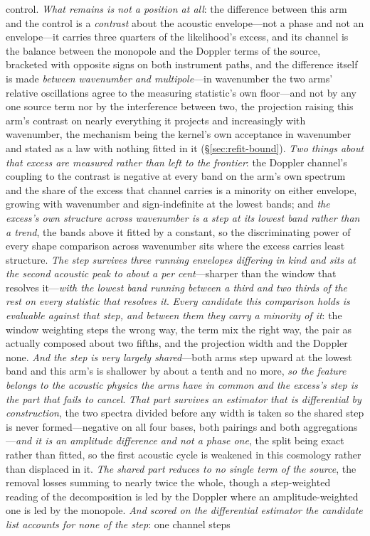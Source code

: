 \documentclass[11pt,a4paper]{article}
\theoremstyle{plain}
\theoremstyle{definition}
\theoremstyle{remark}
\begin{document}
\begin{enumerate}
control. \emph{What remains is not a position at all}: the difference between this arm and the control is a \emph{contrast} about the acoustic envelope---not a phase and not an envelope---it carries three quarters of the likelihood's excess, and its channel is the balance between the monopole and the Doppler terms of the source, bracketed with opposite signs on both instrument paths, and the difference itself is made \emph{between wavenumber and multipole}---in wavenumber the two arms' relative oscillations agree to the measuring statistic's own floor---and not by any one source term nor by the interference between two, the projection raising this arm's contrast on nearly everything it projects and increasingly with wavenumber, the mechanism being the kernel's own acceptance in wavenumber and stated as a law with nothing fitted in it (\S\ref{sec:refit-bound}). \emph{Two things about that excess are measured rather than left to the frontier}: the Doppler channel's coupling to the contrast is negative at every band on the arm's own spectrum and the share of the excess that channel carries is a minority on either envelope, growing with wavenumber and sign-indefinite at the lowest bands; and \emph{the excess's own structure across wavenumber is a step at its lowest band rather than a trend}, the bands above it fitted by a constant, so the discriminating power of every shape comparison across wavenumber sits where the excess carries least structure. \emph{The step survives three running envelopes differing in kind and sits at the second acoustic peak to about a per cent}---sharper than the window that resolves it---\emph{with the lowest band running between a third and two thirds of the rest on every statistic that resolves it}. \emph{Every candidate this comparison holds is evaluable against that step, and between them they carry a minority of it}: the window weighting steps the wrong way, the term mix the right way, the pair as actually composed about two fifths, and the projection width and the Doppler none. \emph{And the step is very largely shared}---both arms step upward at the lowest band and this arm's is shallower by about a tenth and no more, \emph{so the feature belongs to the acoustic physics the arms have in common and the excess's step is the part that fails to cancel}. \emph{That part survives an estimator that is differential by construction}, the two spectra divided before any width is taken so the shared step is never formed---negative on all four bases, both pairings and both aggregations---\emph{and it is an amplitude difference and not a phase one}, the split being exact rather than fitted, so the first acoustic cycle is weakened in this cosmology rather than displaced in it. \emph{The shared part reduces to no single term of the source}, the removal losses summing to nearly twice the whole, though a step-weighted reading of the decomposition is led by the Doppler where an amplitude-weighted one is led by the monopole. \emph{And scored on the differential estimator the candidate list accounts for none of the step}: one channel steps 
\end{enumerate}
\end{document}
